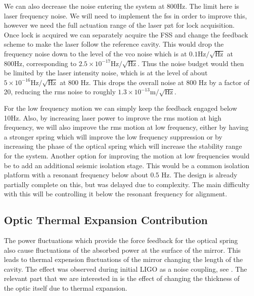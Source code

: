 We can also decrease the noise entering the system at 800Hz. The limit here
is laser frequency noise.
We will need to implement the \ac{fss} in order to improve this, however
we need the full actuation range of the laser \ac{pzt} for lock acquisition.
Once lock is acquired
we can separately acquire the FSS and change the feedback scheme to make the
laser follow the reference cavity.
This would drop the frequency noise down to the level of the \ac{vco} noise
which is at $0.1\mathrm{Hz/\sqrt{Hz}}$ at 800Hz, corresponding to
$2.5\times 10^{-17}\mathrm{Hz/\sqrt{Hz}}$.
Thus the noise budget would then be limited by the laser intensity noise, which
is at the level of about $5\times 10^{-16}\mathrm{Hz/\sqrt{Hz}}$ at 800 Hz.
This drops the overall noise at 800 Hz by a factor of 20, reducing the \ac{rms}
noise to roughly $1.3\times 10^{-13} \mathrm{m/\sqrt{Hz}}$.

For the low frequency motion we can simply keep the feedback engaged below 10Hz.
Also, by increasing laser power to improve the \ac{rms} motion at high
frequency, we
will also improve the \ac{rms} motion at low frequency, either by having a
stronger spring which will improve the low frequency suppression or by
increasing the phase of the optical spring which will increase the stability
range for the system.
Another option for improving the motion at low frequencies would be to add an
additional seismic isolation stage.
This would be a common isolation platform with a resonant frequency below
about 0.5 Hz.
The design is already partially complete on this, but was delayed due to
complexity.
The main difficulty with this will be controlling it below the resonant
frequency for alignment.







\subsection{Optic Thermal Expansion Contribution}
\label{sec:opticthermalexpansion}
The power fluctuations which provide the force feedback for the optical spring
also cause fluctuations of the absorbed power at the surface of the mirror.
This leads to thermal expension fluctuations of the mirror changing the length
of the cavity.
The effect was observed during initial LIGO as a noise coupling, see
\cite{Ballmer:thesis}.
The relevant part that we are interested in is the effect of changing
the thickness of the optic itself due to thermal expansion.

